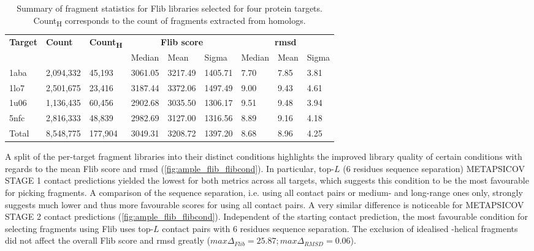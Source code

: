 \begin{table}[H]
  \centering
  \scriptsize
  \caption[Flib fragment characterics across four protein targets]{Summary of fragment statistics for Flib libraries selected for four protein targets. Count\textsubscript{H} corresponds to the count of fragments extracted from homologs.}
  \label{table:ample_flib_frag_summary}
  \begin{tabularx}{\textwidth}{X X X X X X X X X}
      \hline
      \multirow{2}{*}{\textbf{Target}} & \multirow{2}{*}{\textbf{Count}} & \multirow{2}{*}{\textbf{Count\textsubscript{H}}} & \multicolumn{3}{c}{\textbf{Flib score}} & \multicolumn{3}{c}{\textbf{\gls{rmsd}}} \\ \cline{4-9}
      		&			&			& Median 	& Mean 		& Sigma 	& Median 	& Mean 	& Sigma \\
      
      \hline
	  1aba	& 2,094,332	& 45,193	& 3061.05	& 3217.49	& 1405.71	& 7.70		& 7.85	& 3.81	\\
  	  1lo7  & 2,501,675	& 23,416	& 3187.44	& 3372.06	& 1497.49	& 9.00		& 9.43	& 4.61  \\
      1u06  & 1,136,435	& 60,456	& 2902.68	& 3035.50	& 1306.17	& 9.51		& 9.48	& 3.94	\\
      5nfc  & 2,816,333	& 48,839	& 2982.69	& 3127.00	& 1316.56	& 8.89		& 9.16	& 4.18	\\ 
      \hline
      Total	& 8,548,775	& 177,904	& 3049.31	& 3208.72	& 1397.20	& 8.68		& 8.96	& 4.25	\\ 
      \hline
  \end{tabularx}
\end{table}

A split of the per-target fragment libraries into their distinct conditions highlights the improved library quality of certain conditions with regards to the mean Flib score and \gls{rmsd} (\cref{fig:ample_flib_flibcond}). In particular, top-$L$ (6 residues sequence separation) METAPSICOV STAGE 1 contact predictions yielded the lowest for both metrics across all targets, which suggests this condition to be the most favourable for picking fragments. A comparison of the sequence separation, i.e. using all contact pairs or medium- and long-range ones only, strongly suggests much lower and thus more favourable scores for using all contact pairs. A very similar difference is noticeable for METAPSICOV STAGE 2 contact predictions (\cref{fig:ample_flib_flibcond}). Independent of the starting contact prediction, the most favourable condition for selecting fragments using Flib uses top-$L$ contact pairs with 6 residues sequence separation. The exclusion of idealised \textalpha-helical fragments did not affect the overall Flib score and \gls{rmsd} greatly ($max \Delta_{Flib}=25.87; max \Delta_{RMSD}=0.06$).

